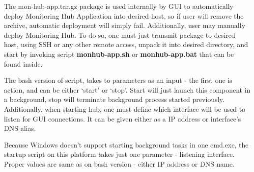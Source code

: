 The mon-hub-app.tar.gz package is used internally by GUI to automatically deploy Monitoring Hub Application into desired host, so if user will remove the archive, automatic deployment will simply fail. Additionally, user may manually deploy Monitoring Hub. To do so, one must just transmit package to desired host, using SSH or any other remote access, unpack it into desired directory, and start by invoking script {\bf monhub-app.sh} or {\bf monhub-app.bat} that can be found inside. 

The bash version of script, takes to parameters as an input - the first one is action, and can be either \lq{}start\rq{} or \lq{}stop\rq{}. Start will just launch this component in a background, stop will terminate background process started previously. Additionally, when starting hub, one must define which interface will be used to listen for GUI connections. It can be given either as a IP address or interface\rq{}s DNS alias.  

Because Windows doesn\rq{}t support starting background tasks in one cmd.exe, the startup script on this platform takes just one parameter - listening interface. Proper values are same as on bash version - either IP  address or DNS name.